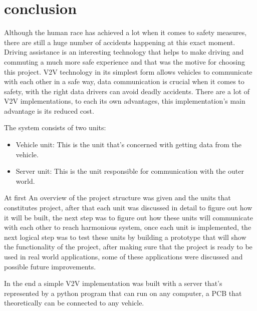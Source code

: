 \chapter{conclusion}

Although the human race has achieved a lot when it comes to safety measures, there are still a huge number of accidents happening at this exact moment. Driving assistance is an interesting technology that helps to make driving and commuting a much more safe experience and that was the motive for choosing this project. V2V technology in its simplest form allows vehicles to communicate with each other in a safe way, data communication is crucial when it comes to safety, with the right data drivers can avoid deadly accidents.
There are a lot of V2V implementations, to each its own advantages, this implementation's main advantage is its reduced cost.

The system consists of two units:
\begin{itemize}
    \item Vehicle unit: This is the unit that’s concerned with getting data from the vehicle.
    \item Server unit: This is the unit responsible for communication with the outer world.
\end{itemize}


At first An overview of the project structure was given and the units that constitutes project, after that each unit was discussed in detail to figure out how it will be built, the next step was to figure out how these units will communicate with each other to reach harmonious system, once each unit is implemented, the next logical step was to test these units by building a prototype that will show the functionality of the project, after making sure that the project is ready to be used in real world applications, some of these applications were discussed and possible future improvements. 

In the end a simple V2V implementation was built with a server that’s represented by a python program that can run on any computer, a PCB that theoretically can be connected to any vehicle.

